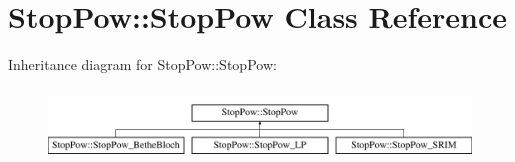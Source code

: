 \hypertarget{class_stop_pow_1_1_stop_pow}{\section{Stop\-Pow\-:\-:Stop\-Pow Class Reference}
\label{class_stop_pow_1_1_stop_pow}
}
Inheritance diagram for Stop\-Pow\-:\-:Stop\-Pow\-:\begin{figure}[H]
\begin{center}
\leavevmode
\includegraphics[height=1.914530cm]{class_stop_pow_1_1_stop_pow}
\end{center}
\end{figure}
